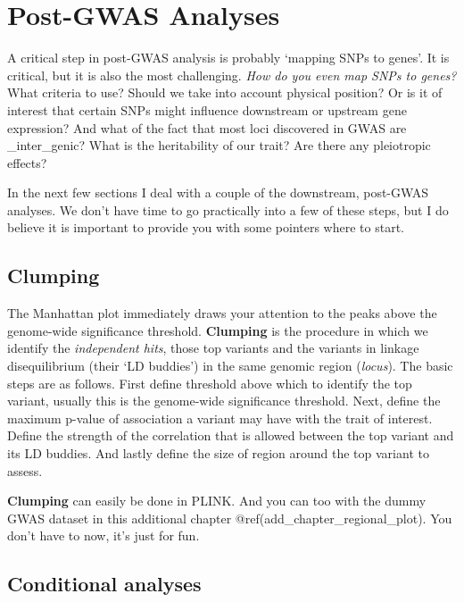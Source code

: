 \documentclass[
]{book}
\begin{document}
\hypertarget{post-gwas}{%
\chapter{Post-GWAS Analyses}\label{post-gwas}}

A critical step in post-GWAS analysis is probably `mapping SNPs to genes'. It is critical, but it is also the most challenging. \emph{How do you even map SNPs to genes?} What criteria to use? Should we take into account physical position? Or is it of interest that certain SNPs might influence downstream or upstream gene expression? And what of the fact that most loci discovered in GWAS are \_inter\_genic? What is the heritability of our trait? Are there any pleiotropic effects?

In the next few sections I deal with a couple of the downstream, post-GWAS analyses. We don't have time to go practically into a few of these steps, but I do believe it is important to provide you with some pointers where to start.

\hypertarget{clumping}{%
\section{Clumping}\label{clumping}}

The Manhattan plot immediately draws your attention to the peaks above the genome-wide significance threshold. \textbf{Clumping} is the procedure in which we identify the \emph{independent hits}, those top variants and the variants in linkage disequilibrium (their `LD buddies') in the same genomic region (\emph{locus}). The basic steps are as follows. First define threshold above which to identify the top variant, usually this is the genome-wide significance threshold. Next, define the maximum p-value of association a variant may have with the trait of interest. Define the strength of the correlation that is allowed between the top variant and its LD buddies. And lastly define the size of region around the top variant to assess.

\textbf{Clumping} can easily be done in PLINK. And you can too with the dummy GWAS dataset in this additional chapter @ref(add\_chapter\_regional\_plot). You don't have to now, it's just for fun.

\hypertarget{conditional-analyses}{%
\section{Conditional analyses}\label{conditional-analyses}}
\end{document}
